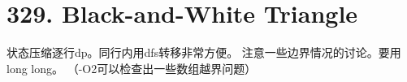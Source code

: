 \section{329. Black-and-White Triangle}
状态压缩逐行dp。同行内用dfs转移非常方便。
注意一些边界情况的讨论。要用long long。
（-O2可以检查出一些数组越界问题）
